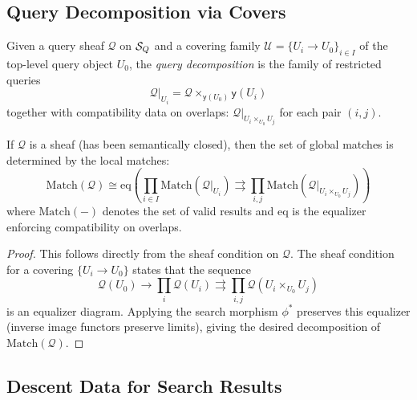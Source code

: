 \documentclass[11pt]{article}
\newcommand{\QuerySheaf}{\mathcal{Q}}
\newcommand{\yo}{\mathsf{y}}                         %
\begin{document}
\subsection{Query Decomposition via Covers}

\begin{definition}\label{def:query-decomp}
Given a query sheaf $\QuerySheaf$ on $\mathcal{S}_Q$ and a covering family
$\mathcal{U} = \{U_i \to U_0\}_{i \in I}$ of the top-level query
object $U_0$, the \emph{query decomposition} is the family of
restricted queries
\[
  \QuerySheaf|_{U_i} = \QuerySheaf \times_{\yo(U_0)} \yo(U_i)
\]
together with compatibility data on overlaps:
$\QuerySheaf|_{U_i \times_{U_0} U_j}$ for each pair $(i, j)$.
\end{definition}

\begin{theorem}\label{thm:decomp-complete}
If $\QuerySheaf$ is a sheaf (\ie has been semantically closed), then
the set of global matches is determined by the local matches:
\[
  \mathrm{Match}(\QuerySheaf) \cong
  \mathrm{eq}\left(
    \prod_{i \in I} \mathrm{Match}(\QuerySheaf|_{U_i})
    \rightrightarrows
    \prod_{i,j} \mathrm{Match}(\QuerySheaf|_{U_i \times_{U_0} U_j})
  \right)
\]
where $\mathrm{Match}(-)$ denotes the set of valid results and
$\mathrm{eq}$ is the equalizer enforcing compatibility on overlaps.
\end{theorem}

\begin{proof}
This follows directly from the sheaf condition on $\QuerySheaf$.
The sheaf condition for a covering $\{U_i \to U_0\}$ states that
the sequence
\[
  \QuerySheaf(U_0) \to \prod_{i} \QuerySheaf(U_i)
  \rightrightarrows \prod_{i,j} \QuerySheaf(U_i \times_{U_0} U_j)
\]
is an equalizer diagram.  Applying the search morphism $\phi^{*}$
preserves this equalizer (inverse image functors preserve limits),
giving the desired decomposition of $\mathrm{Match}(\QuerySheaf)$.
\end{proof}

\subsection{Descent Data for Search Results}
\end{document}
